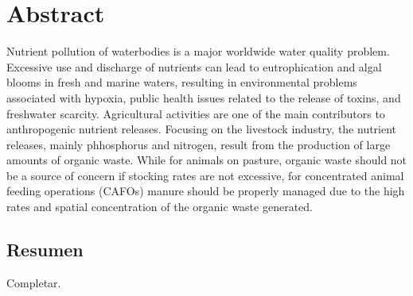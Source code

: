 \begingroup
\let\clearpage\relax
\let\cleardoublepage\relax
\let\cleardoublepage\relax

\chapter*{Abstract}


Nutrient pollution of waterbodies is a major worldwide water quality problem. Excessive use and discharge of nutrients can lead to eutrophication and algal blooms in fresh and marine waters, resulting in environmental problems associated with hypoxia, public health issues related to the release of toxins, and freshwater scarcity. 
Agricultural activities are one of the main contributors to anthropogenic nutrient releases. Focusing on the livestock industry, the nutrient releases, mainly phhosphorus and nitrogen, result from the production of large amounts of organic waste.  While for animals on pasture, organic waste should not be a source of concern if stocking rates are not excessive, for concentrated animal feeding oper­ations (CAFOs) manure should be properly managed due to the high rates and spatial concentration of the organic waste generated.




\vfill

\begin{otherlanguage}{spanish}
\chapter*{Resumen}
Completar.
\end{otherlanguage}

\endgroup

\vfill

